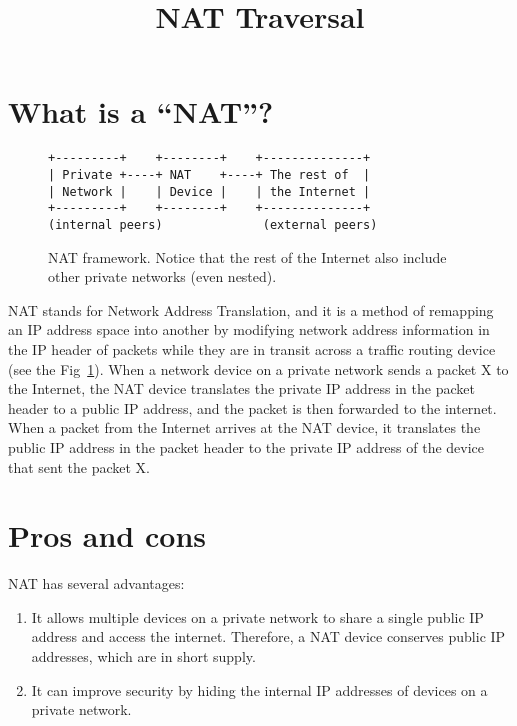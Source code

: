 
\title{NAT Traversal}

\maketitle

\section{What is a ``NAT''?}

\begin{figure}
\begin{verbatim}
+---------+    +--------+    +--------------+
| Private +----+ NAT    +----+ The rest of  |
| Network |    | Device |    | the Internet |
+---------+    +--------+    +--------------+
(internal peers)              (external peers)
\end{verbatim}
\caption{NAT framework. Notice that the rest of the Internet also
  include other private networks (even nested).}
\label{fig:NAT_framework}
\end{figure}

NAT stands for Network Address Translation, and it is a method of
remapping an IP address space into another by modifying network
address information in the IP header of packets while they are in
transit across a traffic routing device (see the
Fig~\ref{fig:NAT_framework}). When a network device on a private network sends
a packet X to the Internet, the NAT device translates the private IP
address in the packet header to a public IP address, and the packet is
then forwarded to the internet. When a packet from the Internet
arrives at the NAT device, it translates the public IP
address in the packet header to the private IP address of the device
that sent the packet X.

\section{Pros and cons}

NAT has several advantages:
\begin{enumerate}
\item It allows multiple devices on a private network to share a
  single public IP address and access the internet. Therefore, a NAT
  device conserves public IP addresses, which are in short supply.
\item It can improve security by hiding the internal IP addresses of
  devices on a private network.
\end{enumerate}

